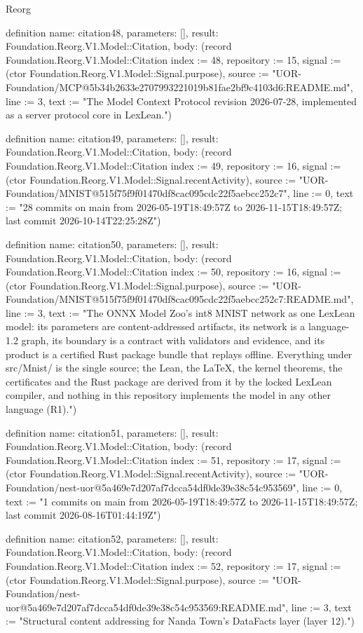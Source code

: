 \begin{lexlean}{Reorg}
\begin{semanticmodule}
definition{
  name: citation48,
  parameters: [],
  result: Foundation.Reorg.V1.Model::Citation,
  body: (record Foundation.Reorg.V1.Model::Citation {index := 48, repository := 15, signal := (ctor Foundation.Reorg.V1.Model::Signal.purpose), source := "UOR-Foundation/MCP@5b34b2633e2707993221019b81fae2bf9c4103d6:README.md", line := 3, text := "The Model Context Protocol revision 2026-07-28, implemented as a server protocol core in LexLean."})
}

definition{
  name: citation49,
  parameters: [],
  result: Foundation.Reorg.V1.Model::Citation,
  body: (record Foundation.Reorg.V1.Model::Citation {index := 49, repository := 16, signal := (ctor Foundation.Reorg.V1.Model::Signal.recentActivity), source := "UOR-Foundation/MNIST@515f75f9f01470df8cac095cdc22f5aebcc252c7", line := 0, text := "28 commits on main from 2026-05-19T18:49:57Z to 2026-11-15T18:49:57Z; last commit 2026-10-14T22:25:28Z"})
}

definition{
  name: citation50,
  parameters: [],
  result: Foundation.Reorg.V1.Model::Citation,
  body: (record Foundation.Reorg.V1.Model::Citation {index := 50, repository := 16, signal := (ctor Foundation.Reorg.V1.Model::Signal.purpose), source := "UOR-Foundation/MNIST@515f75f9f01470df8cac095cdc22f5aebcc252c7:README.md", line := 3, text := "The ONNX Model Zoo's int8 MNIST network as one LexLean model: its parameters are content-addressed artifacts, its network is a language-1.2 graph, its boundary is a contract with validators and evidence, and its product is a certified Rust package bundle that replays offline. Everything under src/Mnist/ is the single source; the Lean, the LaTeX, the kernel theorems, the certificates and the Rust package are derived from it by the locked LexLean compiler, and nothing in this repository implements the model in any other language (R1)."})
}

definition{
  name: citation51,
  parameters: [],
  result: Foundation.Reorg.V1.Model::Citation,
  body: (record Foundation.Reorg.V1.Model::Citation {index := 51, repository := 17, signal := (ctor Foundation.Reorg.V1.Model::Signal.recentActivity), source := "UOR-Foundation/nest-uor@5a469e7d207af7dcca54df0de39e38c54c953569", line := 0, text := "1 commits on main from 2026-05-19T18:49:57Z to 2026-11-15T18:49:57Z; last commit 2026-08-16T01:44:19Z"})
}

definition{
  name: citation52,
  parameters: [],
  result: Foundation.Reorg.V1.Model::Citation,
  body: (record Foundation.Reorg.V1.Model::Citation {index := 52, repository := 17, signal := (ctor Foundation.Reorg.V1.Model::Signal.purpose), source := "UOR-Foundation/nest-uor@5a469e7d207af7dcca54df0de39e38c54c953569:README.md", line := 3, text := "Structural content addressing for Nanda Town's DataFacts layer (layer 12)."})
}


\end{semanticmodule}
\end{lexlean}
